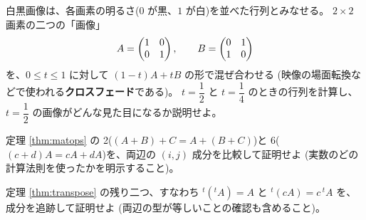 \begin{mondai}[発展]\label{q:mat-ex10}
白黒画像は、各画素の明るさ($0$ が黒、$1$ が白)を並べた行列とみなせる。
$2 \times 2$ 画素の二つの「画像」
\[
A = \begin{pmatrix}1 & 0 \\ 0 & 1\end{pmatrix}, \qquad B = \begin{pmatrix}0 & 1 \\ 1 & 0\end{pmatrix}
\]
を、$0 \le t \le 1$ に対して $(1 - t)A + tB$ の形で混ぜ合わせる
(映像の場面転換などで使われる\textbf{クロスフェード}である)。
$t = \dfrac{1}{2}$ と $t = \dfrac{1}{4}$ のときの行列を計算し、
$t = \dfrac{1}{2}$ の画像がどんな見た目になるか説明せよ。
\end{mondai}

\begin{mondai}[証明]\label{q:mat-ex11}
定理 \ref{thm:matops} の 2($(A + B) + C = A + (B + C)$)と
6($(c + d)A = cA + dA$)を、両辺の $(i,j)$ 成分を比較して証明せよ
(実数のどの計算法則を使ったかを明示すること)。
\end{mondai}

\begin{mondai}[証明]\label{q:mat-ex12}
定理 \ref{thm:transpose} の残り二つ、すなわち ${}^t({}^t\!A) = A$ と
${}^t(cA) = c\,{}^t\!A$ を、成分を追跡して証明せよ
(両辺の型が等しいことの確認も含めること)。
\end{mondai}

